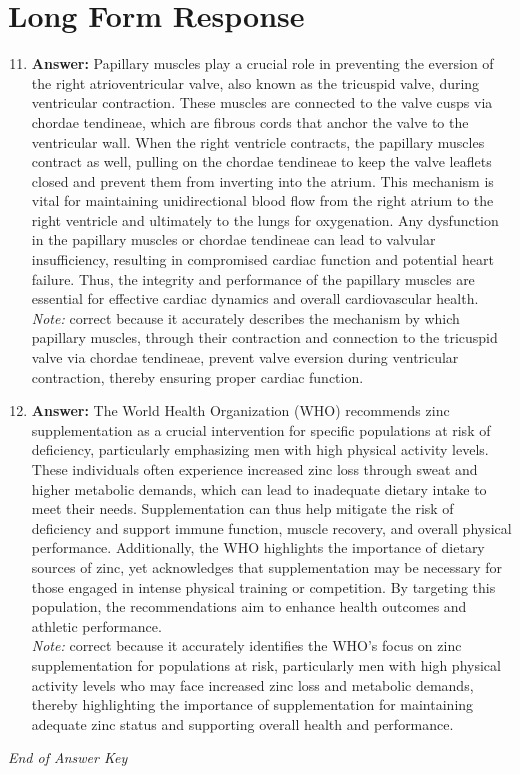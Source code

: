 \documentclass[12pt]{article}
\begin{document}
\section*{Long Form Response}
\begin{enumerate}[label=\arabic*.]
\setcounter{enumi}{10}
\item \textbf{Answer:} Papillary muscles play a crucial role in preventing the eversion of the right atrioventricular valve, also known as the tricuspid valve, during ventricular contraction. These muscles are connected to the valve cusps via chordae tendineae, which are fibrous cords that anchor the valve to the ventricular wall. When the right ventricle contracts, the papillary muscles contract as well, pulling on the chordae tendineae to keep the valve leaflets closed and prevent them from inverting into the atrium. This mechanism is vital for maintaining unidirectional blood flow from the right atrium to the right ventricle and ultimately to the lungs for oxygenation. Any dysfunction in the papillary muscles or chordae tendineae can lead to valvular insufficiency, resulting in compromised cardiac function and potential heart failure. Thus, the integrity and performance of the papillary muscles are essential for effective cardiac dynamics and overall cardiovascular health.
\\ \textit{Note:} correct because it accurately describes the mechanism by which papillary muscles, through their contraction and connection to the tricuspid valve via chordae tendineae, prevent valve eversion during ventricular contraction, thereby ensuring proper cardiac function.
\item \textbf{Answer:} The World Health Organization (WHO) recommends zinc supplementation as a crucial intervention for specific populations at risk of deficiency, particularly emphasizing men with high physical activity levels. These individuals often experience increased zinc loss through sweat and higher metabolic demands, which can lead to inadequate dietary intake to meet their needs. Supplementation can thus help mitigate the risk of deficiency and support immune function, muscle recovery, and overall physical performance. Additionally, the WHO highlights the importance of dietary sources of zinc, yet acknowledges that supplementation may be necessary for those engaged in intense physical training or competition. By targeting this population, the recommendations aim to enhance health outcomes and athletic performance.
\\ \textit{Note:} correct because it accurately identifies the WHO's focus on zinc supplementation for populations at risk, particularly men with high physical activity levels who may face increased zinc loss and metabolic demands, thereby highlighting the importance of supplementation for maintaining adequate zinc status and supporting overall health and performance.
\end{enumerate}

\vfill
\noindent\textit{End of Answer Key}
\end{document}
